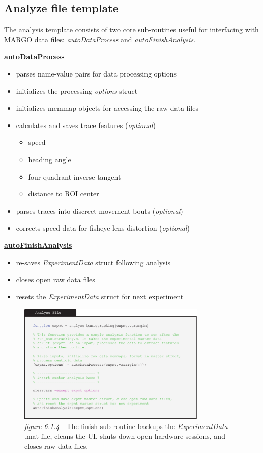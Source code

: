 \documentclass[11pt]{article}
\begin{document}
\newpage
\subsection{Analyze file template}

The analysis template consists of two core sub-routines useful for interfacing with MARGO data files: \textit{autoDataProcess} and \textit{autoFinishAnalysis}.

\textbf{\underline{autoDataProcess}}
\begin{itemize}
	\itemsep0em
	\item parses name-value pairs for data processing options
	\item initializes the processing \textit{options} struct
	\item initializes memmap objects for accessing the raw data files
	\item calculates and saves trace features (\textit{optional})
	\begin{itemize}
		\itemsep0em
		\item speed
		\item heading angle
		\item four quadrant inverse tangent
		\item distance to ROI center
	\end{itemize}
	\item parses traces into discreet movement bouts (\textit{optional})
	\item corrects speed data for fisheye lens distortion (\textit{optional})
\end{itemize}
\textbf{\underline{autoFinishAnalysis}}
\begin{itemize}
	\itemsep0em
	\item re-saves \textit{\textit{ExperimentData}} struct following analysis
	\item closes open raw data files
	\item resets the \textit{\textit{ExperimentData}} struct for next experiment
\end{itemize}

\begin{figure}[h!]
	\begin{center}
		\includegraphics[width=0.8\textwidth]{images/custom_exp/analysis.pdf}
		\caption*{\footnotesize {\textit{figure 6.1.4} - The finish sub-routine backups the \textit{\textit{ExperimentData}} .mat file, cleans the UI, shuts down open hardware sessions, and closes raw data files.}}
	\end{center}
\end{figure}
\end{document}
